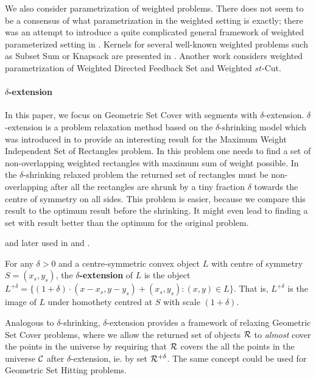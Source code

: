 We also consider parametrization of weighted problems.
There does not seem to be a consensus of what parametrization
in the weighted setting is exactly; there
was an attempt to introduce a quite complicated general
framework of weighted parameterized setting in \cite{weighted_framework}.
Kernels for several well-known weighted problems
such as Subset Sum or Knapsack are presented in \cite{kernel_weighted}.
Another work \cite{weighted_flow} considers weighted
parametrization of Weighted Directed Feedback Set and Weighted $st$-Cut.

\paragraph{$\delta$-extension}
In this paper, we focus on Geometric Set Cover with segments with $\delta$-extension.
$\delta$-extension is a problem relaxation method based on the
$\delta$-shrinking model which was introduced in \cite{shrinking_original}
to provide an interesting result for
the Maximum Weight Independent Set of Rectangles problem.
In this problem one needs to find a set of non-overlapping
weighted rectangles with maximum sum of weight possible.
In the $\delta$-shrinking relaxed problem
the returned set of rectangles must be non-overlapping
after all the rectangles are shrunk by a tiny fraction $\delta$
towards the centre of symmetry on all sides.
This problem is easier, because we compare this result
to the optimum result before the shrinking. It might
even lead to finding a set with result better than the optimum
for the original problem.

and later used in \cite{shrinking2} and \cite{shrinking1}.



\begin{defi}
\label{definition:delta_extension}
For any $\delta > 0$ and a centre-symmetric convex object $L$ with
centre of symmetry $S = (x_s, y_s)$,
the \textbf{$\delta$-extension} of $L$ is the object $L^{+\delta} =
\{(1 + \delta)\cdot(x - x_s, y - y_s) + (x_s, y_s) : (x, y) \in L\}$.
That is, $L^{+\delta}$ is the image of $L$ under homothety centred
at $S$ with scale $(1+\delta)$.
\end{defi}

Analogous to $\delta$-shrinking,
$\delta$-extension provides a framework of relaxing
Geometric Set Cover problems, where we allow the returned set of
objects $\mathcal{R}$ to \textit{almost} cover the points in the universe
by requiring that $\mathcal{R}$ covers the all the points in the universe
$\mathcal{C}$ after $\delta$-extension, ie. by set $\mathcal{R}^{+\delta}$.
The same concept could be used for Geometric Set Hitting problems.
 
